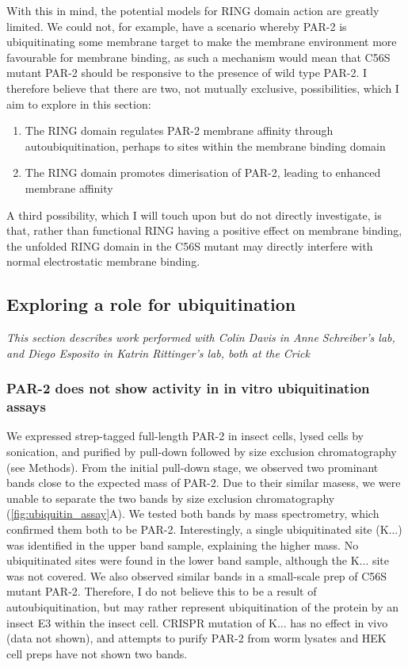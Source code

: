 \documentclass[12pt]{"article"}
\begin{document}
With this in mind, the potential models for RING domain action are greatly limited. We could not, for example, have a scenario whereby PAR-2 is ubiquitinating some membrane target to make the membrane environment more favourable for membrane binding, as such a mechanism would mean that C56S mutant PAR-2 should be responsive to the presence of wild type PAR-2. I therefore believe that there are two, not mutually exclusive, possibilities, which I aim to explore in this section:
\begin{enumerate}
\item The RING domain regulates PAR-2 membrane affinity through autoubiquitination, perhaps to sites within the membrane binding domain
\item The RING domain promotes dimerisation of PAR-2, leading to enhanced membrane affinity
\end{enumerate}

A third possibility, which I will touch upon but do not directly investigate, is that, rather than functional RING having a positive effect on membrane binding, the unfolded RING domain in the C56S mutant may directly interfere with normal electrostatic membrane binding.

\subsection{Exploring a role for ubiquitination}

\textit{This section describes work performed with Colin Davis in Anne Schreiber's lab, and Diego Esposito in Katrin Rittinger's lab, both at the Crick}

\subsubsection{PAR-2 does not show activity in in vitro ubiquitination assays}


We expressed strep-tagged full-length PAR-2 in insect cells, lysed cells by sonication, and purified by pull-down followed by size exclusion chromatography (see Methods). From the initial pull-down stage, we observed two prominant bands close to the expected mass of PAR-2. Due to their similar masess, we were unable to separate the two bands by size exclusion chromatography (\cref{fig:ubiquitin_assay}A). We tested both bands by mass spectrometry, which confirmed them both to be PAR-2. Interestingly, a single ubiquitinated site (K...) was identified in the upper band sample, explaining the higher mass. No ubiquitinated sites were found in the lower band sample, although the K... site was not covered. We also observed similar bands in a small-scale prep of C56S mutant PAR-2. Therefore, I do not believe this to be a result of autoubiquitination, but may rather represent ubiquitination of the protein by an insect E3 within the insect cell. CRISPR mutation of K... has no effect in vivo (data not shown), and attempts to purify PAR-2 from worm lysates and HEK cell preps have not shown two bands.\\
\end{document}
